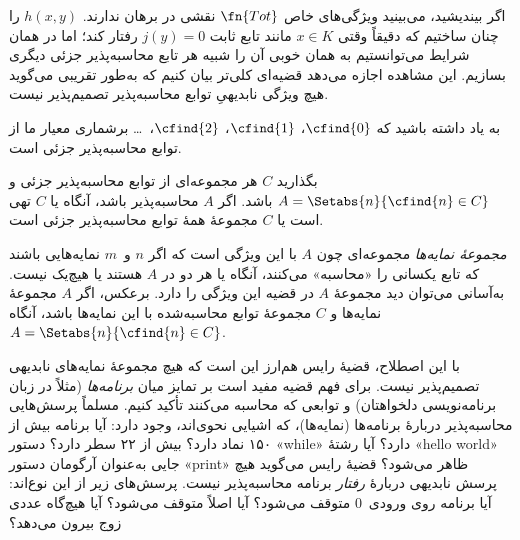 \documentclass[../../../include/open-logic-section]{subfiles}
\begin{document}

اگر بیندیشید، می‌بینید ویژگی‌های خاص $\fn{Tot}$ نقشی در برهان
 ندارند. $h(x,y)$ را چنان ساختیم که دقیقاً
وقتی $x\in K$ مانند تابع ثابت $j(y)=0$ رفتار کند؛ اما در همان شرایط
می‌توانستیم به همان خوبی آن را شبیه هر تابع محاسبه‌پذیر جزئی دیگری
بسازیم. این مشاهده اجازه می‌دهد قضیه‌ای کلی‌تر بیان کنیم که به‌طور
تقریبی می‌گوید هیچ ویژگی نابدیهیِ توابع محاسبه‌پذیر تصمیم‌پذیر نیست.

به یاد داشته باشید که $\cfind{0}$، $\cfind{1}$، $\cfind{2}$،~\dots
برشماری معیار ما از توابع محاسبه‌پذیر جزئی است.

\begin{thm}
  بگذارید $C$ هر مجموعه‌ای از توابع محاسبه‌پذیر جزئی و
  $A=\Setabs{n}{\cfind{n}\in C}$ باشد. اگر $A$ محاسبه‌پذیر باشد،
  آنگاه یا $C$ تهی است یا $C$ مجموعهٔ همهٔ توابع محاسبه‌پذیر جزئی
  است.
\end{thm}

\emph{مجموعهٔ نمایه‌ها} مجموعه‌ای چون $A$ با این ویژگی است که اگر
$n$ و~$m$ نمایه‌هایی باشند که تابع یکسانی را «محاسبه» می‌کنند، آنگاه
یا هر دو در $A$ هستند یا هیچ‌یک نیست. به‌آسانی می‌توان دید مجموعهٔ
$A$ در قضیه این ویژگی را دارد. برعکس، اگر $A$ مجموعهٔ نمایه‌ها و $C$
مجموعهٔ توابع محاسبه‌شده با این نمایه‌ها باشد، آنگاه
$A=\Setabs{n}{\cfind{n}\in C}$.

\begin{explain}
با این اصطلاح، قضیهٔ رایس هم‌ارز این است که هیچ مجموعهٔ نمایه‌های
نابدیهی تصمیم‌پذیر نیست. برای فهم قضیه مفید است بر تمایز میان
\emph{برنامه‌ها} (مثلاً در زبان برنامه‌نویسی دلخواهتان) و توابعی که
محاسبه می‌کنند تأکید کنیم. مسلماً پرسش‌هایی محاسبه‌پذیر دربارهٔ
برنامه‌ها (نمایه‌ها)، که اشیایی نحوی‌اند، وجود دارد: آیا برنامه بیش
از ۱۵۰ نماد دارد؟ بیش از ۲۲ سطر دارد؟ دستور «while» دارد؟ آیا رشتهٔ
«hello world» جایی به‌عنوان آرگومان دستور «print» ظاهر می‌شود؟ قضیهٔ
رایس می‌گوید هیچ پرسش نابدیهی دربارهٔ \emph{رفتار} برنامه محاسبه‌پذیر
نیست. پرسش‌های زیر از این نوع‌اند: آیا برنامه روی ورودی~$0$ متوقف
می‌شود؟ آیا اصلاً متوقف می‌شود؟ آیا هیچ‌گاه عددی زوج بیرون می‌دهد؟
\end{explain}
\end{document}
